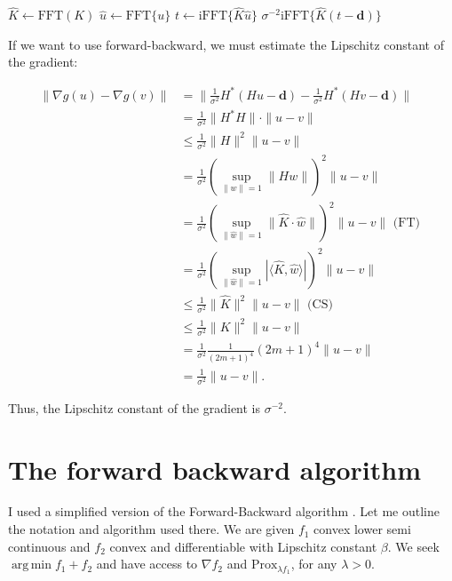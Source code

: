 \documentclass[paper=a4, fontsize=11pt]{scrartcl} %
\DeclareMathOperator*{\argmin}{arg\,min}
\numberwithin{equation}{section} %
\numberwithin{figure}{section} %
\numberwithin{table}{section} %
\newcommand{\data}{\mathbf{d}}
\newcommand{\prox}{\text{Prox}}
\newcommand{\fft}{\text{FFT}}
\newcommand{\ifft}{\text{i}\fft}
\begin{document}
\begin{algorithm}
  \caption{$\nabla \frac{1}{2\sigma^2} \|Hu - \data\|^2$}
  \begin{algorithmic}
    \Function{Gradient}{$\data$}
    \State $\hat K \gets \fft(K)$
    \State $\hat u \gets \fft\{u\}$
    \State $t \gets \ifft \{ \hat{K} \hat{u}\}$
    \State \Return $\sigma^{-2}\ifft \{ \hat{K}(t - \data ) \}$
  \end{algorithmic}
\end{algorithm}


If we want to use forward-backward, we must estimate the Lipschitz
constant of the gradient:

\begin{align*}
  \|\nabla g(u) - \nabla g(v)\| &= \|\frac{1}{\sigma^2} H^{*}(Hu - \data ) - \frac{1}{\sigma^2}H^{*}(Hv - \data)\| \\
  &=\frac{1}{\sigma^2}\|H^{*}H\| \cdot \|u-v\|\\
  &\leq \frac{1}{\sigma^2}\|H\|^2 \|u-v\| \\
  &= \frac{1}{\sigma^2} \left ( \sup_{\|w\| = 1} \|Hw\| \right )^2 \|u-v\| \\
  &= \frac{1}{\sigma^2} \left ( \sup_{\|\hat{w}\| = 1} \|\hat{K} \cdot \hat{w}\| \right )^2 \|u-v\| \text{ (FT) }\\
  &= \frac{1}{\sigma^2} \left ( \sup_{\|\hat{w}\| = 1} |\langle \hat{K},  \hat{w}\rangle| \right )^2 \|u-v\| \\
  &\leq \frac{1}{\sigma^2} \|\hat{K}\|^2 \|u-v\| \text{ (CS) }\\
  &\leq \frac{1}{\sigma^2} \|K\|^2 \|u-v\|\\
  &=\frac{1}{\sigma^2} \frac{1}{(2m+1)^4} (2m+1)^4 \|u-v\| \\
  &= \frac{1}{\sigma^2} \|u-v\|.
\end{align*}

Thus, the Lipschitz constant of the gradient is $\sigma^{-2}$.

\section{The forward backward algorithm}

I used a simplified version of the Forward-Backward algorithm
\cite[algorithm 3.4]{combettes2011proximal}. Let me outline the
notation and algorithm used there. We are given $f_1$ convex lower
semi continuous and $f_2$ convex and differentiable with Lipschitz
constant $\beta$. We seek $\argmin f_1 + f_2$ and have access to
$\nabla f_2$ and $\prox_{\lambda f_1}$, for any $\lambda > 0$.
\end{document}
